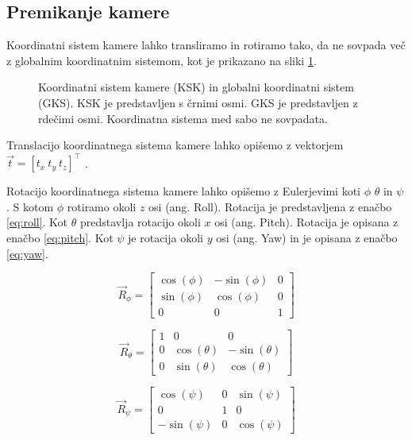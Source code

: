 \subsection{Premikanje kamere}
Koordinatni sistem kamere lahko transliramo in rotiramo tako, da ne sovpada več z globalnim koordinatnim sistemom, kot je prikazano na sliki \ref{fig:premikanje-kamere}. 

\begin{figure}[htb]
\centering

\caption[Koordinatni sistem kamere in globalni koordinatni sistem]{Koordinatni sistem kamere (KSK) in globalni koordinatni sistem (GKS). KSK je predstavljen s črnimi osmi. GKS je predstavljen z rdečimi osmi. Koordinatna sistema med sabo ne sovpadata.}
\label{fig:premikanje-kamere}
\end{figure}

Translacijo koordinatnega sistema kamere lahko opišemo z vektorjem $\vec{t} = \left[t_x~t_y~t_z\right]^\top$ \cite{trucco1998introductory}. 

Rotacijo koordinatnega sistema kamere lahko opišemo z Eulerjevimi koti $\phi$ $\theta$ in $\psi$ \cite{bajd2011osnove}. S kotom $\phi$ rotiramo okoli $z$ osi (ang. Roll). Rotacija je predstavljena z enačbo \eqref{eq:roll}. Kot $\theta$ predstavlja rotacijo okoli $x$ osi (ang. Pitch). Rotacija je opisana z enačbo \eqref{eq:pitch}. Kot $\psi$ je rotacija okoli $y$ osi (ang. Yaw) in je opisana z enačbo \eqref{eq:yaw}.

\begin{equation}
\vec{R}_\phi = \begin{bmatrix}
\cos(\phi) & - \sin(\phi) & 0 \\
\sin(\phi) & \cos(\phi) & 0 \\
0 & 0 & 1
\end{bmatrix}
\label{eq:roll}
\end{equation}

\begin{equation}
\vec{R}_\theta = \begin{bmatrix}
1 & 0 & 0 \\
0 & \cos(\theta) & - \sin(\theta) \\
0 & \sin(\theta) & \cos(\theta)
\end{bmatrix}
\label{eq:pitch}
\end{equation}

\begin{equation}
\vec{R}_\psi = \begin{bmatrix}
\cos(\psi) & 0 & \sin(\psi) \\
0 & 1 & 0 \\
- \sin(\psi) & 0 & \cos(\psi) 
\end{bmatrix}
\label{eq:yaw}
\end{equation}


